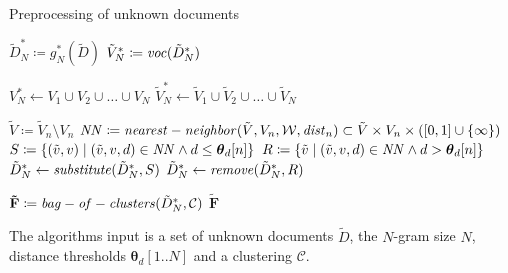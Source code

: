 \begin{algorithm}
\label{alg:preprocess-unknown-data}
\caption{Preprocessing of unknown documents}

\begin{algorithmic}[1]

\State $\tilde{D}_N^* \coloneqq g_N^*(\tilde{D})$ 
\label{alg:preprocess-unknown-data:n-grams}
\State $\tilde{V}_N^* \coloneqq \mathit{voc}(\tilde{D}_N^*)$

\State $V_N^* \gets V_1 \cup V_2 \cup \ldots \cup V_N$ 
\label{alg:preprocess-unknown-data:n-grams-known-partition}
\State $\tilde{V}_N^* \gets \tilde{V}_1 \cup \tilde{V}_2 \cup \ldots \cup
\tilde{V}_N$
\label{alg:preprocess-unknown-data:n-grams-unknown-partition}

\State $\tilde{V} \coloneqq \tilde{V}_n \setminus V_n$
\State $\mathit{NN} \coloneqq \mathit{nearest-neighbor}(\tilde{V}, V_n,\mathcal{W},
\mathit{dist}_n) \subset \tilde{V} \times V_n \times ([0,1]\cup\{\infty\})$ 
\label{alg:preprocess-unknown-data:nearest-neighbor}
\State $S \coloneqq \left\{(\tilde{v}, v) \mid (\tilde{v}, v,d) \in \mathit{NN}
\land d \leq \boldsymbol \theta_d[n]\right\}$
\label{alg:preprocess-unknown-data:substitutes} 
\State $R \coloneqq \left\{\tilde{v} \mid (\tilde{v}, v,d) \in \mathit{NN}
\land d > \boldsymbol \theta_d[n]\right\}$ 
\State $\tilde{D}_N^* \gets \mathit{substitute}(\tilde{D}_N^*,S)$
\State $\tilde{D}_N^* \gets \mathit{remove}(\tilde{D}_N^*,R)$
\label{alg:preprocess-unknown-data:substitutes-end}
\EndFor

\State $\mathbf{\tilde{F}} \coloneqq \mathit{bag-of-clusters}(\tilde{D}_N^*, 
\mathcal{C})$ 
\label{alg:preprocess-unknown-data:boc}
\State \Return $\mathbf{\tilde{F}}$
\EndFunction
\end{algorithmic}
\end{algorithm}

The algorithms input is a set of unknown documents $\tilde{D}$, the $N$-gram
size $N$, distance thresholds $\boldsymbol \theta_d[1..N]$ and a clustering
$\mathcal{C}$.

